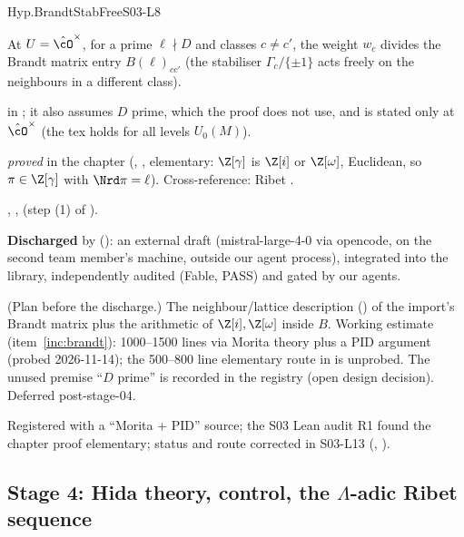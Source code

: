 \begin{hypentry}{Hyp.BrandtStabFree}{\kinddis}{S03-L8}
\item[Statement] At $U=\hat\cO^\times$, for a prime $\ell\nmid D$ and classes $c\ne c'$, the weight $w_c$ divides the
  Brandt matrix entry $B(\ell)_{cc'}$ (the stabiliser $\Gamma_c/\{\pm1\}$ acts freely on the neighbours in a different
  class).
\item[Lean]  in ; it also assumes $D$ prime, which
  the proof does not use, and is stated only at $\hat\cO^\times$ (the tex holds for all levels $U_0(M)$).
\item[Source] \emph{proved} in the chapter (, \stproved, elementary: $\Z[\gamma]$ is $\Z[i]$ or
  $\Z[\omega]$, Euclidean, so $\pi\in\Z[\gamma]$ with $\Nrd\pi=\ell$). Cross-reference: Ribet \cite[Thm.~3.12]{Ri90}.
\item[Used by] , ,
   (step (1) of ).
\item[Status] \textbf{Discharged} by 
  (): an external draft (mistral-large-4-0 via opencode, on the second team member's machine,
  outside our agent process), integrated into the library, independently audited (Fable, PASS) and gated by our agents.
\item[Discharge] (Plan before the discharge.) The neighbour/lattice description () of the import's Brandt matrix plus the
  arithmetic of $\Z[i],\Z[\omega]$ inside $B$. Working estimate (item~\ref{inc:brandt}): 1000--1500 lines via Morita theory plus a PID argument (probed
  2026-11-14); the 500--800 line elementary route in  is unprobed. The unused premise ``$D$ prime'' is
  recorded in the registry (open design decision). Deferred post-stage-04.
\item[History] Registered with a ``Morita + PID'' source; the S03 Lean audit R1 found the chapter proof elementary;
  status and route corrected in S03-L13 (, ).
\end{hypentry}

\subsection{Stage 4: Hida theory, control, the $\Lambda$-adic Ribet sequence}

